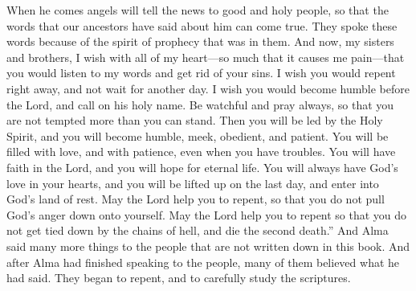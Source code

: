 When he comes angels will tell the news to good and holy people, so that the words that our ancestors have said about him can come true. They spoke these words because of the spirit of prophecy that was in them.
\bverse \iffalse And now, my brethren, I wish from the inmost part of my heart, yea, with great anxiety even unto pain, that ye would hearken unto my words, and cast off your sins, and not procrastinate the day of your repentance; \fi
And now, my sisters and brothers, I wish with all of my heart---so much that it causes me pain---that you would listen to my words and get rid of your sins. I wish you would repent right away, and not wait for another day.
\bverse \iffalse But that ye would humble yourselves before the Lord, and call on his holy name, and watch and pray continually, that ye may not be tempted above that which ye can bear, and thus be led by the Holy Spirit, becoming humble, meek, submissive, patient, full of love and all long-suffering; \fi
I wish you would become humble before the Lord, and call on his holy name. Be watchful and pray always, so that you are not tempted more than you can stand. Then you will be led by the Holy Spirit, and you will become humble, meek, obedient, and patient. You will be filled with love, and with patience, even when you have troubles.
\bverse \iffalse Having faith on the Lord; having a hope that ye shall receive eternal life; having the love of God always in your hearts, that ye may be lifted up at the last day and enter into his rest. \fi
You will have faith in the Lord, and you will hope for eternal life. You will always have God's love in your hearts, and you will be lifted up on the last day, and enter into God's land of rest.
\bverse \iffalse And may the Lord grant unto you repentance, that ye may not bring down his wrath upon you, that ye may not be bound down by the chains of hell, that ye may not suffer the second death. \fi
May the Lord help you to repent, so that you do not pull God's anger down onto yourself. May the Lord help you to repent so that you do not get tied down by the chains of hell, and die the second death.''
\bverse \iffalse And Alma spake many more words unto the people, which are not written in this book. \fi
And Alma said many more things to the people that are not written down in this book.
\bchapter
\bverse \iffalse And it came to pass after he had made an end of speaking unto the people many of them did believe on his words, and began to repent, and to search the scriptures. \fi
And after Alma had finished speaking to the people, many of them believed what he had said. They began to repent, and to carefully study the scriptures.
